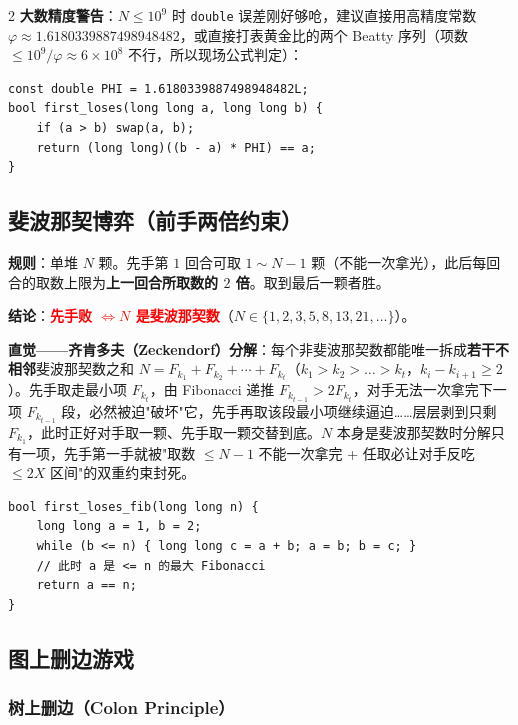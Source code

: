 \begin{multicols*}{2}
		\textbf{大数精度警告}：$N \le 10^9$ 时 \texttt{double} 误差刚好够呛，建议直接用高精度常数 $\varphi \approx 1.6180339887498948482$，或直接打表黄金比的两个 Beatty 序列（项数 $\le 10^9 / \varphi \approx 6 \times 10^8$ 不行，所以现场公式判定）：

		\begin{verbatim}
const double PHI = 1.6180339887498948482L;
bool first_loses(long long a, long long b) {
    if (a > b) swap(a, b);
    return (long long)((b - a) * PHI) == a;
}
		\end{verbatim}

		\subsection{斐波那契博弈（前手两倍约束）}

		\textbf{规则}：单堆 $N$ 颗。先手第 $1$ 回合可取 $1 \sim N-1$ 颗（不能一次拿光），此后每回合的取数上限为\textbf{上一回合所取数的 $2$ 倍}。取到最后一颗者胜。

		\textbf{结论}：\textcolor{red}{\textbf{先手败 $\iff N$ 是斐波那契数}}（$N \in \{1, 2, 3, 5, 8, 13, 21, \dots\}$）。

		\textbf{直觉——齐肯多夫（Zeckendorf）分解}：每个非斐波那契数都能唯一拆成\textbf{若干不相邻}斐波那契数之和 $N = F_{k_1} + F_{k_2} + \cdots + F_{k_t}$（$k_1 > k_2 > \dots > k_t$，$k_i - k_{i+1} \ge 2$）。先手取走最小项 $F_{k_t}$，由 Fibonacci 递推 $F_{k_{t-1}} > 2 F_{k_t}$，对手无法一次拿完下一项 $F_{k_{t-1}}$ 段，必然被迫"破坏"它，先手再取该段最小项继续逼迫……层层剥到只剩 $F_{k_1}$，此时正好对手取一颗、先手取一颗交替到底。$N$ 本身是斐波那契数时分解只有一项，先手第一手就被"取数 $\le N-1$ 不能一次拿完 + 任取必让对手反吃 $\le 2X$ 区间"的双重约束封死。

		\begin{verbatim}
bool first_loses_fib(long long n) {
    long long a = 1, b = 2;
    while (b <= n) { long long c = a + b; a = b; b = c; }
    // 此时 a 是 <= n 的最大 Fibonacci
    return a == n;
}
		\end{verbatim}

		\subsection{图上删边游戏}

		\subsubsection{树上删边（Colon Principle）}


\end{multicols*}
